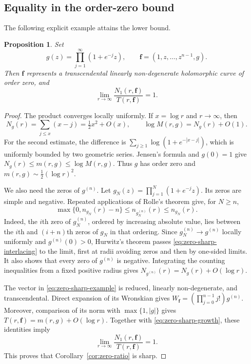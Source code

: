 \documentclass[11pt,letterpaper,reqno]{amsart}
\newtheorem{prop}[thm]{Proposition}
\theoremstyle{remark}
\numberwithin{equation}{section}
\newcommand{\fv}{\bm f}
\begin{document}
\subsection{Equality in the order-zero bound}

The following explicit example attains the lower bound.

\begin{prop}\label{prop:sharpness-zero}
Set
\begin{equation}\label{eq:zero-sharp-example}
 g(z)=\prod_{j=1}^\infty(1+e^{-j}z),
 \qquad \fv=(1,z,\ldots,z^{n-1},g).
\end{equation}
Then $\fv$ represents a transcendental linearly non-degenerate
holomorphic curve of order zero, and
\[
 \lim_{r\to\infty}\frac{N_1(r,\fv)}{T(r,\fv)}=1.
\]
\end{prop}
\begin{proof}
The product converges locally uniformly. If $x=\log r$ and $r\to\infty$,
then
\begin{equation}\label{eq:zero-sharp-growth}
 N_g(r)=\sum_{j\leq x}(x-j)=\tfrac12x^2+O(x),
 \qquad \log M(r,g)=N_g(r)+O(1).
\end{equation}
For the second estimate, the difference is
$\sum_{j\geq1}\log(1+e^{-|x-j|})$, which is uniformly bounded by two
geometric series. Jensen's formula and $g(0)=1$ give
$N_g(r)\leq m(r,g)\leq\log M(r,g)$. Thus $g$ has order zero and
$m(r,g)\sim\tfrac12(\log r)^2$.

We also need the zeros of $g^{(n)}$. Let
$g_N(z)=\prod_{j=1}^N(1+e^{-j}z)$. Its zeros are simple and negative.
Repeated applications of Rolle's theorem give, for $N\geq n$,
\begin{equation}\label{eq:zero-sharp-interlacing}
 \max\{0,n_{g_N}(r)-n\}\leq n_{g_N^{(n)}}(r)\leq n_{g_N}(r).
\end{equation}
Indeed, the $i$th zero of $g_N^{(n)}$, ordered by increasing absolute
value, lies between the $i$th and $(i+n)$th zeros of $g_N$ in that
ordering. Since $g_N^{(n)}\to g^{(n)}$ locally uniformly and
$g^{(n)}(0)>0$, Hurwitz's theorem passes
\eqref{eq:zero-sharp-interlacing} to the limit, first at radii avoiding
zeros and then by one-sided limits. It also shows that every zero of
$g^{(n)}$ is negative. Integrating the counting inequalities from a
fixed positive radius gives
$N_{g^{(n)}}(r)=N_g(r)+O(\log r)$.

The vector in \eqref{eq:zero-sharp-example} is reduced, linearly
non-degenerate, and transcendental. Direct expansion of its Wronskian gives
$W_{\fv}=(\prod_{j=0}^{n-1}j!)g^{(n)}$.
Moreover, comparison of its norm with $\max\{1,|g|\}$ gives
$T(r,\fv)=m(r,g)+O(\log r)$.
Together with \eqref{eq:zero-sharp-growth}, these identities imply
\[
 \lim_{r\to\infty}\frac{N_1(r,\fv)}{T(r,\fv)}=1.
\]
This proves that Corollary~\ref{cor:zero-ratio} is sharp.
\end{proof}
\end{document}
